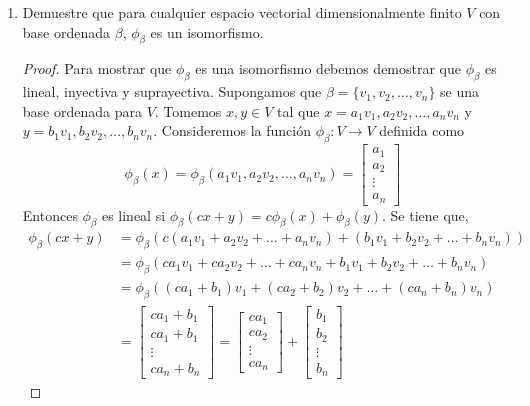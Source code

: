\documentclass[letterpaper]{article}
\begin{document}
\begin{enumerate}
\item Demuestre que para cualquier espacio vectorial dimensionalmente finito $V$ con base ordenada $\beta$,
$\phi_\beta$ es un isomorfismo.
\begin{proof}
Para mostrar que $\phi_\beta$ es una isomorfismo debemos demostrar que $\phi_\beta$ es lineal, inyectiva y
suprayectiva. Supongamos que $\beta = \{ v_1, v_2, \ldots, v_n \}$ se una base ordenada para $V$. Tomemos
$x, y \in V$ tal que $x = a_1 v_1, a_2 v_2, \ldots, a_n v_n$ y $y = b_1 v_1, b_2 v_2, \ldots, b_n v_n$.
Consideremos la función $\phi_\beta : V \to V$ definida como
\[
    \phi_\beta(x) = \phi_\beta(a_1 v_1, a_2 v_2, \ldots, a_n v_n) = 
    \begin{bmatrix}
        a_1\\ 
        a_2\\ 
        \vdots\\
        a_n
    \end{bmatrix}
\]
Entonces $\phi_\beta$ es lineal si $\phi_\beta(cx + y) = c\phi_\beta(x) + \phi_\beta(y)$. Se tiene que,
\begin{align*}
    \phi_\beta(cx + y)
        &= \phi_\beta(c(a_1 v_1 + a_2 v_2 + \ldots + a_n v_n) + (b_1 v_1 + b_2 v_2 + \ldots + b_n v_n))\\
        &= \phi_\beta(c a_1 v_1 + c a_2 v_2 + \ldots + c a_n v_n + b_1 v_1 + b_2 v_2 + \ldots + b_n v_n)\\
        &= \phi_\beta((c a_1 + b_1) v_1 + (c a_2 + b_2) v_2 + \ldots + (c a_n + b_n) v_n )\\
        &= \begin{bmatrix}
                c a_1 + b_1\\ 
                c a_1 + b_1\\
                \vdots\\
                c a_n + b_n
            \end{bmatrix}
        =  \begin{bmatrix}
                c a_1\\ 
                c a_2\\
                \vdots\\
                c a_n
            \end{bmatrix}
            +  \begin{bmatrix}
                    b_1\\ 
                    b_2\\
                    \vdots\\
                    b_n

\end{bmatrix}
\end{align*}
\end{proof}
\end{enumerate}
\end{document}
